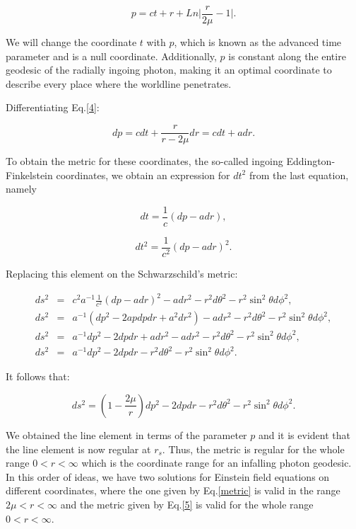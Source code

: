 \documentclass[letterpaper,11pt,onecolumn]{article}
\begin{document}
\begin{equation}
    p= ct + r + Ln\Big| \frac{r}{2\mu}-1 \Big|.\label{4}
\end{equation}

We will change the coordinate $t$ with $p$, which is known as the advanced time parameter and is a null coordinate. Additionally, $p$ is constant along the entire geodesic of the radially ingoing photon, making it an optimal coordinate to describe every place where the worldline penetrates.

Differentiating Eq.\ref{4}: 

\begin{equation*}
    dp= cdt +\frac{r}{r-2\mu}dr=cdt+adr.
\end{equation*}

To obtain the metric for these coordinates, the so-called ingoing Eddington-Finkelstein coordinates, we obtain an expression for $dt^2$ from the last equation, namely

\begin{equation*}
    dt= \frac{1}{c} (dp-adr),
\end{equation*}

\begin{equation*}
    dt^2= \frac{1}{c^2} (dp-adr)^2.
\end{equation*}

Replacing this element on the Schwarzschild's metric:

\begin{eqnarray*}
    	ds^2 &=&c^2a^{-1}\frac{1}{c^2} (dp-adr)^2 - a dr^2 - r^2 d\theta^2 - r^2 \sin^2 \theta d\phi^2,\\
    	ds^2 &=& a^{-1}(dp^2-2apdpdr+a^2dr^2) - a dr^2 - r^2 d\theta^2 - r^2 \sin^2 \theta d\phi^2,\\
    	ds^2 &=& a^{-1}dp^2-2dpdr+adr^2- a dr^2 - r^2 d\theta^2 - r^2 \sin^2 \theta d\phi^2,\\ 
    	ds^2 &=& a^{-1}dp^2-2dpdr-  r^2 d\theta^2 - r^2 \sin^2 \theta d\phi^2.
\end{eqnarray*}

It follows that:

\begin{equation}
ds^2 =\left( 1 - \frac{2\mu}{r}\right)dp^2-2dpdr- r^2 d\theta^2 - r^2 \sin^2 \theta d\phi^2 \label{5}.
\end{equation}

We obtained the line element in terms of the parameter $p$ and it is evident that the line element is now regular at $r_s$. Thus, the metric is regular for the whole range $0<r<\infty$ which is the coordinate range for an infalling photon geodesic. In this order of ideas, we have two solutions for Einstein field equations on different coordinates, where the one given by Eq.\ref{metric} is valid in the range $2\mu<r<\infty$ and the metric given by Eq.\ref{5} is valid for the whole range $0<r<\infty$.
\end{document}

